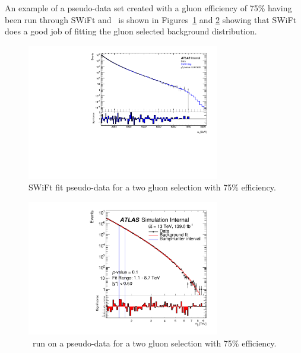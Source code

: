 An example of a pseudo-data set created with a gluon efficiency of 75\% having been run through SWiFt and \BumpHunter\ 
is shown in Figures~\ref{fig:SWiFtPD_75percentGG} and \ref{fig:figure1_GG_PD_75percent} showing that SWiFt 
does a good job of fitting the gluon selected background distribution. 


\begin{figure}[htb]
 \centering
\includegraphics[width=0.75\textwidth]{figures/04-BackgroundEstimation/SWiFtPD_75percentGG}
\caption{SWiFt fit pseudo-data for a two gluon selection with 75\% efficiency.  \label{fig:SWiFtPD_75percentGG}}
\end{figure}


\begin{figure}[htb]
 \centering
\includegraphics[width=0.75\textwidth]{figures/04-BackgroundEstimation/figure1_GG_PD_75percent.pdf}
\caption{\BumpHunter\ run on a pseudo-data for a two gluon selection with 75\% efficiency.\label{fig:figure1_GG_PD_75percent}}
\end{figure}

